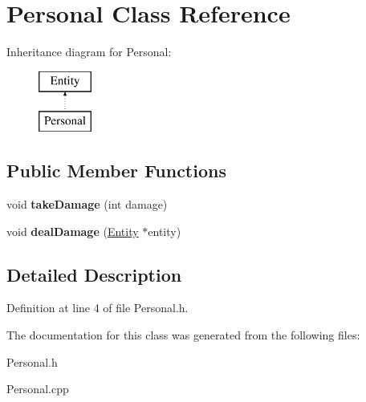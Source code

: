 \hypertarget{classPersonal}{}\section{Personal Class Reference}
\label{classPersonal}
Inheritance diagram for Personal\+:\begin{figure}[H]
\begin{center}
\leavevmode
\includegraphics[height=2.000000cm]{classPersonal}
\end{center}
\end{figure}
\subsection*{Public Member Functions}
\begin{DoxyCompactItemize}
\item 
\mbox{\label{classPersonal_a328545fe84883222567751fce32a7b18}} 
void {\bfseries take\+Damage} (int damage)
\item 
\mbox{\label{classPersonal_a9f9733d17414ca1ff51482f610884e12}} 
void {\bfseries deal\+Damage} (\hyperlink{classEntity}{Entity} $\ast$entity)
\end{DoxyCompactItemize}


\subsection{Detailed Description}


Definition at line 4 of file Personal.\+h.



The documentation for this class was generated from the following files\+:\begin{DoxyCompactItemize}
\item 
Personal.\+h\item 
Personal.\+cpp\end{DoxyCompactItemize}
